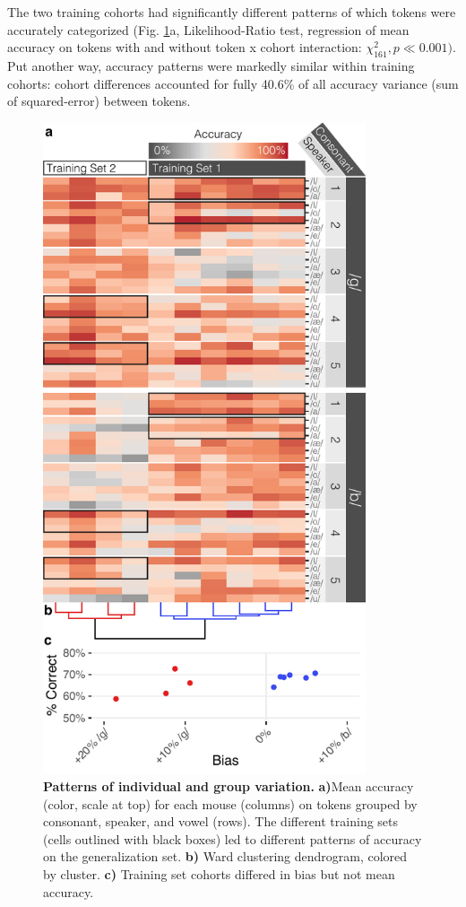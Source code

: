 The two training cohorts had significantly different patterns of which tokens were accurately categorized (Fig. \ref{heat}a, Likelihood-Ratio test, regression of mean accuracy on tokens with and without token x cohort interaction: $\chi^2_{161}, p \ll 0.001)$. Put another way, accuracy patterns were markedly similar within training cohorts: cohort differences accounted for fully 40.6\% of all accuracy variance (sum of squared-error) between tokens.

\begin{figure}[!h]
\includegraphics[width=3.75in]{speech/figures/Figure4.pdf}
\caption{\textbf{Patterns of individual and group variation.} \textbf{a)}Mean accuracy (color, scale at top) for each mouse (columns) on tokens grouped by consonant, speaker, and vowel (rows). The different training sets (cells outlined with black boxes) led to different patterns of accuracy on the generalization set. \textbf{b)} Ward clustering dendrogram, colored by cluster. \textbf{c)} Training set cohorts differed in bias but not mean accuracy.}
\label{heat}
\end{figure}

